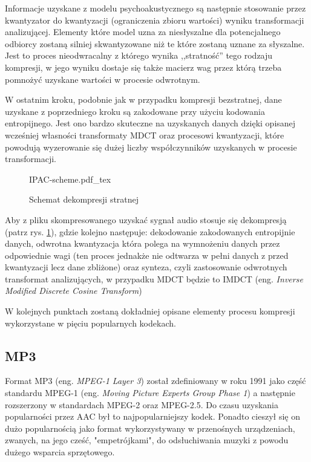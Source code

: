 \documentclass[pl,12pt]{aghdpl}
\let\Oldsubsection\subsection%
\renewcommand{\subsection}{\FloatBarrier\Oldsubsection}
\begin{document}
Informacje uzyskane z modelu psychoakustycznego są następnie stosowanie przez
kwantyzator do kwantyzacji (ograniczenia zbioru wartości) wyniku transformacji
analizującej. Elementy które model uzna za niesłyszalne dla potencjalnego
odbiorcy zostaną silniej skwantyzowane niż te które zostaną uznane za
słyszalne. Jest to proces nieodwracalny z którego wynika ,,stratność'' tego
rodzaju kompresji, w jego wyniku dostaje się także macierz wag przez którą
trzeba pomnożyć uzyskane wartości w procesie odwrotnym.

W ostatnim kroku, podobnie jak w przypadku kompresji bezstratnej, dane uzyskane
z poprzedniego kroku są zakodowane przy użyciu kodowania entropijnego. Jest ono
bardzo skuteczne na uzyskanych danych dzięki opisanej wcześniej własności
transformaty MDCT oraz procesowi kwantyzacji, które powodują wyzerowanie się
dużej liczby współczynników uzyskanych w procesie transformacji.

\begin{figure}[!tbh]
  \centering
  {IPAC-scheme.pdf_tex}
  \caption{Schemat dekompresji stratnej}
  \label{fig:IPAC_scheme}
\end{figure}

Aby z pliku skompresowanego uzyskać sygnał audio stosuje się dekompresją (patrz
rys. \ref{fig:IPAC_scheme}), gdzie kolejno następuje: dekodowanie zakodowanych
entropijnie danych, odwrotna kwantyzacja która polega na wymnożeniu danych
przez odpowiednie wagi (ten proces jednakże nie odtwarza w pełni danych z przed
kwantyzacji lecz dane zbliżone) oraz synteza, czyli zastosowanie odwrotnych
transformat analizujących, w przypadku MDCT będzie to IMDCT (eng.
\textit{Inverse Modified Discrete Cosine Transform})

W kolejnych punktach zostaną dokładniej opisane elementy procesu kompresji
wykorzystane w pięciu popularnych kodekach.

\subsection{MP3}
Format MP3 (eng. \textit{MPEG-1 Layer 3}) został zdefiniowany w roku 1991 jako część
standardu MPEG-1 (eng. \textit{Moving Picture Experts Group Phase 1}) a
następnie rozszerzony w standardach MPEG-2 oraz MPEG-2.5. Do czasu uzyskania
popularności przez AAC był to najpopularniejszy kodek. Ponadto cieszył się on
dużo popularnością jako format wykorzystywany w przenośnych urządzeniach,
zwanych, na jego cześć, "empetrójkami", do odsłuchiwania muzyki z powodu dużego
wsparcia sprzętowego.
\end{document}
